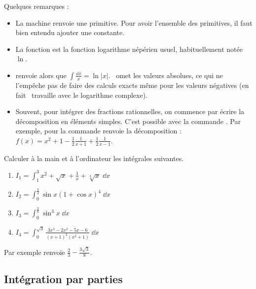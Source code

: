 \documentclass[class=report,crop=false]{standalone}
\begin{document}
Quelques remarques :
\begin{itemize}
  \item La machine renvoie une primitive. Pour avoir l'ensemble des primitives, il faut
  bien entendu ajouter une constante.

  \item La fonction  est la fonction logarithme népérien usuel, habituellement
  notée $\ln$.
  
  \item {} renvoie  alors
  que $\int \frac{\dd x}{x} = \ln |x|$. \Sage\ omet les valeurs absolues, ce qui ne l'empêche pas de faire
  des calculs exacts même pour les valeurs négatives (en fait \Sage\ travaille avec le logarithme complexe).
  
  \item Souvent, pour intégrer des fractions rationnelles, on commence par écrire 
  la décomposition en éléments simples. C'est possible avec
  la commande . Par exemple, pour
   la commande  
  renvoie la décomposition : %
  $f(x) = x^2  + 1 - \frac12\frac{1}{x + 1} + \frac12\frac{1}{x - 1}$.
  
\end{itemize}



\begin{tp}
Calculer à la main et à l'ordinateur les intégrales suivantes.
\begin{enumerate}
  \item $\displaystyle I_1 = \int_1^3 x^2 + \sqrt{x} + \frac1x + \sqrt[3]{x} \; \dd x$
  \item $\displaystyle I_2 = \int_0^\frac{\pi}{2} \sin x (1+\cos x)^4 \; \dd x$
  \item $\displaystyle I_3 = \int_0^{\frac\pi6} \sin^3 x \; \dd x$
  \item $\displaystyle I_4 = \int_0^{\sqrt3} \frac{3x^3 - 2x^2 - 5x - 6}{(x + 1)^2(x^2 + 1)} \; \dd x$
\end{enumerate}
\end{tp}

Par exemple  renvoie 
$\frac23 - \frac{3\sqrt{3}}{8}$.



\subsection{Intégration par parties}
\end{document}
